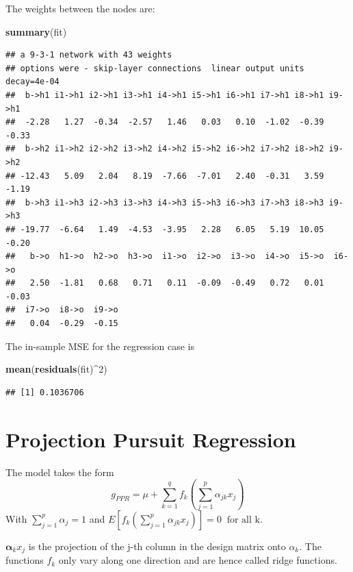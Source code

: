 \documentclass[]{book}
\newenvironment{Shaded}{\begin{snugshade}}{\end{snugshade}}
\newcommand{\KeywordTok}[1]{\textcolor[rgb]{0.13,0.29,0.53}{\textbf{{#1}}}}
\newcommand{\DecValTok}[1]{\textcolor[rgb]{0.00,0.00,0.81}{{#1}}}
\newcommand{\NormalTok}[1]{{#1}}
\begin{document}
The weights between the nodes are:

\begin{Shaded}
\begin{Highlighting}[]
\KeywordTok{summary}\NormalTok{(fit) }
\end{Highlighting}
\end{Shaded}

\begin{verbatim}
## a 9-3-1 network with 43 weights
## options were - skip-layer connections  linear output units  decay=4e-04
##  b->h1 i1->h1 i2->h1 i3->h1 i4->h1 i5->h1 i6->h1 i7->h1 i8->h1 i9->h1 
##  -2.28   1.27  -0.34  -2.57   1.46   0.03   0.10  -1.02  -0.39  -0.33 
##  b->h2 i1->h2 i2->h2 i3->h2 i4->h2 i5->h2 i6->h2 i7->h2 i8->h2 i9->h2 
## -12.43   5.09   2.04   8.19  -7.66  -7.01   2.40  -0.31   3.59  -1.19 
##  b->h3 i1->h3 i2->h3 i3->h3 i4->h3 i5->h3 i6->h3 i7->h3 i8->h3 i9->h3 
## -19.77  -6.64   1.49  -4.53  -3.95   2.28   6.05   5.19  10.05  -0.20 
##   b->o  h1->o  h2->o  h3->o  i1->o  i2->o  i3->o  i4->o  i5->o  i6->o 
##   2.50  -1.81   0.68   0.71   0.11  -0.09  -0.49   0.72   0.01  -0.03 
##  i7->o  i8->o  i9->o 
##   0.04  -0.29  -0.15
\end{verbatim}

The in-sample MSE for the regression case is

\begin{Shaded}
\begin{Highlighting}[]
\KeywordTok{mean}\NormalTok{(}\KeywordTok{residuals}\NormalTok{(fit)^}\DecValTok{2}\NormalTok{) }
\end{Highlighting}
\end{Shaded}

\begin{verbatim}
## [1] 0.1036706
\end{verbatim}

\section{Projection Pursuit
Regression}\label{projection-pursuit-regression}

The model takes the form
\[g_{PPR} = \mu + \sum\limits_{k = 1}^q f_k(\sum \limits_{j = 1}^p
\alpha_{jk}x_j) \] With \(\sum \limits_{j = 1}^p \alpha_j = 1\) and
\(E[f_k(\sum \limits_{j = 1}^p \alpha_{jk}x_j)] = 0 \;\; \text{for all k}\).

\(\mathbf{\alpha}_k x_j\) is the projection of the j-th column in the
design matrix onto \(\alpha_k\). The functions \(f_k\) only vary along
one direction and are hence called ridge functions.
\end{document}
